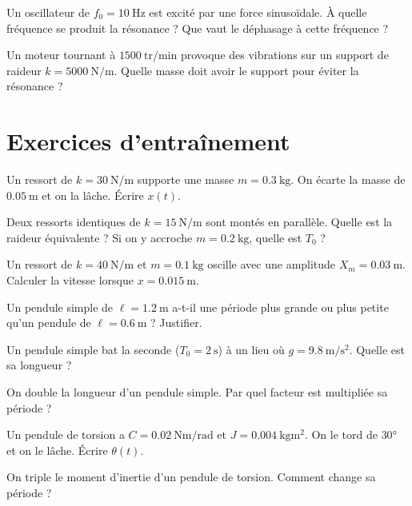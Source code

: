\exo{} Un oscillateur de $f_0 = \SI{10}{\hertz}$ est excité par une force sinusoïdale. À quelle fréquence se produit la résonance ? Que vaut le déphasage à cette fréquence ?

\exo{} Un moteur tournant à $\num{1500}~\mathrm{tr/min}$ provoque des vibrations sur un support de raideur $k = \SI{5000}{\newton\per\metre}$. Quelle masse doit avoir le support pour éviter la résonance ?

\section{Exercices d'entraînement}


\exo{} Un ressort de $k = \SI{30}{\newton\per\metre}$ supporte une masse $m = \SI{0.3}{\kilogram}$. On écarte la masse de $\SI{0.05}{\metre}$ et on la lâche. Écrire $x(t)$.

\exo{} Deux ressorts identiques de $k = \SI{15}{\newton\per\metre}$ sont montés en parallèle. Quelle est la raideur équivalente ? Si on y accroche $m = \SI{0.2}{\kilogram}$, quelle est $T_0$ ?

\exo{} Un ressort de $k = \SI{40}{\newton\per\metre}$ et $m = \SI{0.1}{\kilogram}$ oscille avec une amplitude $X_m = \SI{0.03}{\metre}$. Calculer la vitesse lorsque $x = \SI{0.015}{\metre}$.


\exo{} Un pendule simple de $\ell = \SI{1.2}{\metre}$ a-t-il une période plus grande ou plus petite qu'un pendule de $\ell = \SI{0.6}{\metre}$ ? Justifier.

\exo{} Un pendule simple bat la seconde ($T_0 = \SI{2}{\second}$) à un lieu où $g = \SI{9.8}{\metre\per\second\squared}$. Quelle est sa longueur ?

\exo{} On double la longueur d'un pendule simple. Par quel facteur est multipliée sa période ?


\exo{} Un pendule de torsion a $C = \SI{0.02}{\newton\metre\per\radian}$ et $J = \SI{0.004}{\kilogram\metre\squared}$. On le tord de $\ang{30}$ et on le lâche. Écrire $\theta(t)$.

\exo{} On triple le moment d'inertie d'un pendule de torsion. Comment change sa période ?

